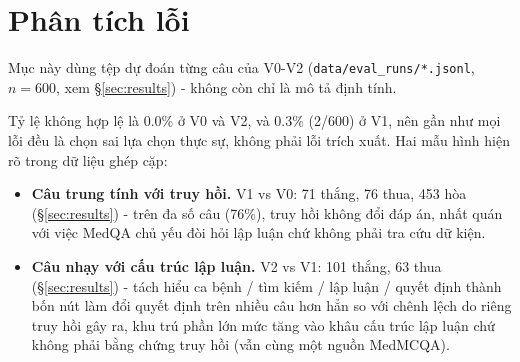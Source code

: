 \documentclass[11pt]{article}
\begin{document}
\FloatBarrier
\section{Phân tích lỗi}
\label{sec:error}
Mục này dùng tệp dự đoán từng câu của V0-V2 (\texttt{data/eval\_runs/*.jsonl}, $n{=}600$, xem
\S\ref{sec:results}) - không còn chỉ là mô tả định tính.

Tỷ lệ không hợp lệ là 0.0\% ở V0 và V2, và 0.3\% (2/600) ở V1, nên gần như mọi lỗi đều là chọn sai lựa
chọn thực sự, không phải lỗi trích xuất. Hai mẫu hình hiện rõ trong dữ liệu ghép cặp:
\begin{itemize}[nosep]
  \item \textbf{Câu trung tính với truy hồi.} V1 vs V0: 71 thắng, 76 thua, 453 hòa (\S\ref{sec:results})
  - trên đa số câu (76\%), truy hồi không đổi đáp án, nhất quán với việc MedQA chủ yếu đòi hỏi lập
  luận chứ không phải tra cứu dữ kiện.
  \item \textbf{Câu nhạy với cấu trúc lập luận.} V2 vs V1: 101 thắng, 63 thua (\S\ref{sec:results}) -
  tách hiểu ca bệnh / tìm kiếm / lập luận / quyết định thành bốn nút làm đổi quyết định trên nhiều câu
  hơn hẳn so với chênh lệch do riêng truy hồi gây ra, khu trú phần lớn mức tăng vào khâu cấu trúc lập
  luận chứ không phải bằng chứng truy hồi (vẫn cùng một nguồn MedMCQA).
\end{itemize}
\end{document}
